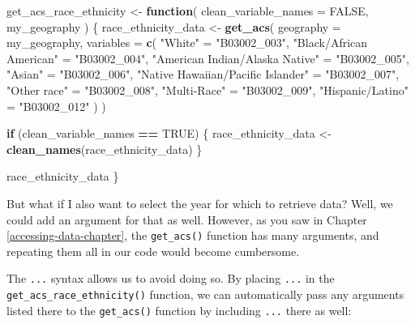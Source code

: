 \documentclass[
]{book}
\newenvironment{Shaded}{\begin{snugshade}}{\end{snugshade}}
\newcommand{\AttributeTok}[1]{\textcolor[rgb]{0.13,0.29,0.53}{#1}}
\newcommand{\ConstantTok}[1]{\textcolor[rgb]{0.56,0.35,0.01}{#1}}
\newcommand{\ControlFlowTok}[1]{\textcolor[rgb]{0.13,0.29,0.53}{\textbf{#1}}}
\newcommand{\FunctionTok}[1]{\textcolor[rgb]{0.13,0.29,0.53}{\textbf{#1}}}
\newcommand{\NormalTok}[1]{#1}
\newcommand{\OtherTok}[1]{\textcolor[rgb]{0.56,0.35,0.01}{#1}}
\newcommand{\SpecialCharTok}[1]{\textcolor[rgb]{0.81,0.36,0.00}{\textbf{#1}}}
\newcommand{\StringTok}[1]{\textcolor[rgb]{0.31,0.60,0.02}{#1}}
\begin{document}
\begin{Shaded}
\begin{Highlighting}[]
\NormalTok{get\_acs\_race\_ethnicity }\OtherTok{\textless{}{-}} \ControlFlowTok{function}\NormalTok{(}
  \AttributeTok{clean\_variable\_names =} \ConstantTok{FALSE}\NormalTok{,}
\NormalTok{  my\_geography}
\NormalTok{) \{}
\NormalTok{  race\_ethnicity\_data }\OtherTok{\textless{}{-}}
    \FunctionTok{get\_acs}\NormalTok{(}
      \AttributeTok{geography =}\NormalTok{ my\_geography,}
      \AttributeTok{variables =} \FunctionTok{c}\NormalTok{(}
        \StringTok{"White"} \OtherTok{=} \StringTok{"B03002\_003"}\NormalTok{,}
        \StringTok{"Black/African American"} \OtherTok{=} \StringTok{"B03002\_004"}\NormalTok{,}
        \StringTok{"American Indian/Alaska Native"} \OtherTok{=} \StringTok{"B03002\_005"}\NormalTok{,}
        \StringTok{"Asian"} \OtherTok{=} \StringTok{"B03002\_006"}\NormalTok{,}
        \StringTok{"Native Hawaiian/Pacific Islander"} \OtherTok{=} \StringTok{"B03002\_007"}\NormalTok{,}
        \StringTok{"Other race"} \OtherTok{=} \StringTok{"B03002\_008"}\NormalTok{,}
        \StringTok{"Multi{-}Race"} \OtherTok{=} \StringTok{"B03002\_009"}\NormalTok{,}
        \StringTok{"Hispanic/Latino"} \OtherTok{=} \StringTok{"B03002\_012"}
\NormalTok{      )}
\NormalTok{    )}

  \ControlFlowTok{if}\NormalTok{ (clean\_variable\_names }\SpecialCharTok{==} \ConstantTok{TRUE}\NormalTok{) \{}
\NormalTok{    race\_ethnicity\_data }\OtherTok{\textless{}{-}} \FunctionTok{clean\_names}\NormalTok{(race\_ethnicity\_data)}
\NormalTok{  \}}

\NormalTok{  race\_ethnicity\_data}
\NormalTok{\}}
\end{Highlighting}
\end{Shaded}

But what if I also want to select the year for which to retrieve data? Well, we could add an argument for that as well. However, as you saw in Chapter \ref{accessing-data-chapter}, the \texttt{get\_acs()} function has many arguments, and repeating them all in our code would become cumbersome.

The \texttt{...} syntax allows us to avoid doing so. By placing \texttt{...} in the \texttt{get\_acs\_race\_ethnicity()} function, we can automatically pass any arguments listed there to the \texttt{get\_acs()} function by including \texttt{...} there as well:
\end{document}
